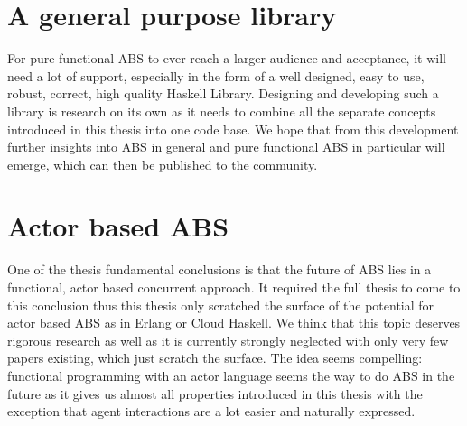 
\section{A general purpose library}
For pure functional ABS to ever reach a larger audience and acceptance, it will need a lot of support, especially in the form of a well designed, easy to use, robust, correct, high quality Haskell Library. Designing and developing such a library is research on its own as it needs to combine all the separate concepts introduced in this thesis into one code base. We hope that from this development further insights into ABS in general and pure functional ABS in particular will emerge, which can then be published to the community.


\section{Actor based ABS}
One of the thesis fundamental conclusions is that the future of ABS lies in a functional, actor based concurrent approach. It required the full thesis to come to this conclusion thus this thesis only scratched the surface of the potential for actor based ABS as in Erlang or Cloud Haskell. We think that this topic deserves rigorous research as well as it is currently strongly neglected with only very few papers existing, which just scratch the surface. The idea seems compelling: functional programming with an actor language seems the way to do ABS in the future as it gives us almost all properties introduced in this thesis with the exception that agent interactions are a lot easier and naturally expressed.

